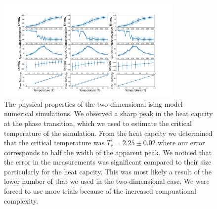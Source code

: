 \documentclass[a4paper]{article}
\begin{document}
    \begin{figure}
        \centering
        \includegraphics[width=0.8\textwidth]{pub/figures/q2c.pdf}
        \caption{The physical properties of the two-dimensional ising model %
            numerical simulations. We observed a sharp peak in the heat %
            capcity at the phase transition, which we used to estimate the %
            critical temperature of the simulation. From the heat capcity %
            we determined that the critical temperature was \(T_{c} = 2.25 \pm 
            0.02\) where our error corresponds to half the width of the %
            apparent peak. We noticed that the error in the measurements %
            was significant compared to their size particularly for the %
            heat capcity. This was most likely a result of the lower number %
            of that we used in the two-dimensional case. We were forced to %
            use more trials because of the increased compuational complexity.}
        \label{FIG5}
    \end{figure}
\end{document}
